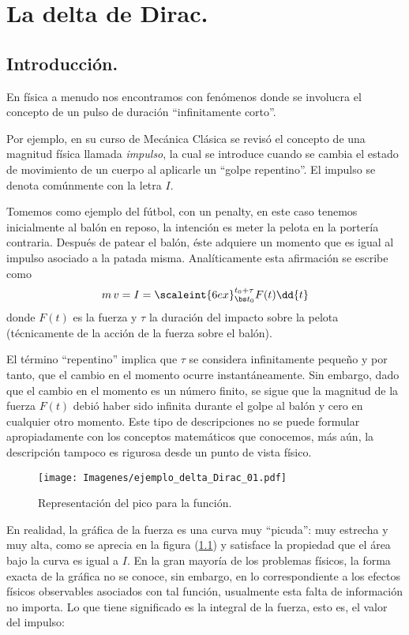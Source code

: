 \chapter{La delta de Dirac.}

\section{Introducción.}
En física a menudo nos encontramos con fenómenos donde se involucra el concepto de un pulso de duración \enquote{infinitamente corto}.
\par
Por ejemplo, en su curso de Mecánica Clásica se revisó el concepto de una magnitud física llamada \emph{impulso}, la cual se introduce cuando se cambia el estado de movimiento de un cuerpo al aplicarle un \enquote{golpe repentino}. El impulso se denota comúnmente con la letra $I$.
\par
Tomemos como ejemplo del fútbol, con un penalty, en este caso tenemos inicialmente al balón en reposo, la intención es meter la pelota en la portería contraria. Después de patear el balón, éste adquiere un momento que es igual al impulso asociado a la patada misma. Analíticamente esta afirmación se escribe como
\begin{align*}
m \, v = I = \scaleint{6ex}_{\bs t_{0}}^{t_{0} + \tau} F (t) \dd{t}
\end{align*}
donde $F (t)$ es la fuerza y $\tau$ la duración del impacto sobre la pelota (técnicamente de la acción de la fuerza sobre el balón).
\par
El término \enquote{repentino} implica que $\tau$ se considera infinitamente pequeño y por tanto, que el cambio en el momento ocurre instantáneamente. Sin embargo, dado que el cambio en el momento es un número finito, se sigue que la magnitud de la fuerza $F (t)$ debió haber sido infinita durante el golpe al balón y cero en cualquier otro momento. Este tipo de descripciones no se puede formular apropiadamente con los conceptos matemáticos que conocemos, más aún, la descripción tampoco es rigurosa desde un punto de vista físico.
\begin{figure}[H]
    \centering
    \texttt{[image: Imagenes/ejemplo\_delta\_Dirac\_01.pdf]}
    \caption{Representación del pico para la función.}
    \label{fig:figura_delta_Dirac_01}
\end{figure}
En realidad, la gráfica de la fuerza es una curva muy \enquote{picuda}: muy estrecha y muy alta, como se aprecia en la figura (\ref{fig:figura_delta_Dirac_01}) y satisface la propiedad que el área bajo la curva es igual a $I$. En la gran mayoría de los problemas físicos, la forma exacta de la gráfica no se conoce, sin embargo, en lo correspondiente a los efectos físicos observables asociados con tal función, usualmente esta falta de información no importa. Lo que tiene significado es la integral de la fuerza, esto es, el valor del impulso:
